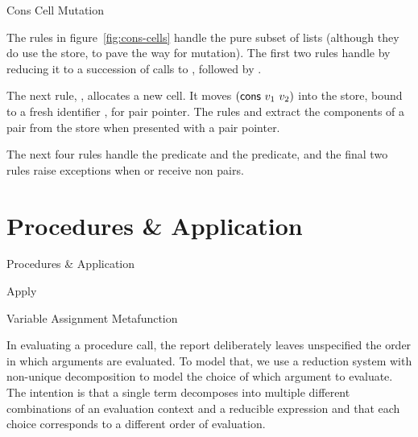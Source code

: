 \beginfig
\begin{center}

\end{center}
\caption{Cons Cell Mutation}\label{fig:cons-cell-mutation}
\endfig

The rules in figure~\ref{fig:cons-cells} handle the pure subset of
lists (although they do use the store, to pave the way for mutation).
The first two rules handle  by reducing it to a
succession of calls to , followed by .

The next rule, , allocates a new  cell.
It moves $(\textnormal{\textsf{cons}}~v_1~v_2)$ into the store, bound to a fresh
identifier , for pair pointer. The rules 
and  extract the components of a pair from the store
when presented with a pair pointer.

The next four rules handle the  predicate and the
 predicate, and the final two rules raise exceptions
when  or  receive non pairs.

\section{Procedures \& Application}

\beginfig
\begin{center}

\end{center}
\caption{Procedures \& Application}\label{fig:procedure-application}
\endfig

\beginfig
\begin{center}

\end{center}
\caption{Apply}\label{fig:apply}
\endfig

\beginfig
\begin{center}

\end{center}
\caption{Variable Assignment Metafunction}\label{fig:varsetd}
\endfig

In evaluating a procedure call, the report deliberately leaves
unspecified the order in which arguments are evaluated. To model that,
we use a reduction system with non-unique decomposition to model the
choice of which argument to evaluate. The intention is that a single
term decomposes into multiple different combinations of an evaluation
context and a reducible expression and that each choice corresponds to
a different order of evaluation.

